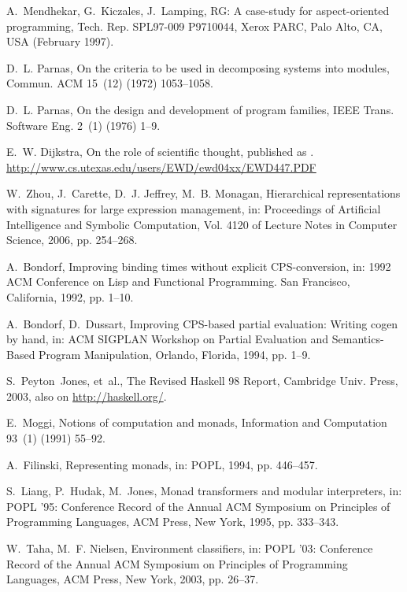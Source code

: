 \documentclass{elsart}
\begin{document}
\begin{thebibliography}{10}
A.~Mendhekar, G.~Kiczales, J.~Lamping, {RG}: {A} case-study for aspect-oriented
  programming, Tech. Rep. SPL97-009 P9710044, {X}erox {PARC}, Palo Alto, CA,
  USA (February 1997).

D.~L. Parnas, On the criteria to be used in decomposing systems into modules,
  Commun. ACM 15~(12) (1972) 1053--1058.

D.~L. Parnas, On the design and development of program families, IEEE Trans.
  Software Eng. 2~(1) (1976) 1--9.

E.~W. Dijkstra, On the role of scientific thought, published as
  \cite{EWD:EWD447pub}.
\newline\urlprefix\url{http://www.cs.utexas.edu/users/EWD/ewd04xx/EWD447.PDF}

W.~Zhou, J.~Carette, D.~J. Jeffrey, M.~B. Monagan, Hierarchical representations
  with signatures for large expression management, in: Proceedings of
  Artificial Intelligence and Symbolic Computation, Vol. 4120 of Lecture Notes
  in Computer Science, 2006, pp. 254--268.

A.~Bondorf, Improving binding times without explicit {CPS}-conversion, in: 1992
  ACM Conference on Lisp and Functional Programming. San Francisco, California,
  1992, pp. 1--10.

A.~Bondorf, D.~Dussart, Improving {CPS-}based partial evaluation: Writing cogen
  by hand, in: {ACM} {SIGPLAN} Workshop on Partial Evaluation and
  Semantics-Based Program Manipulation, Orlando, Florida, 1994, pp. 1--9.

S.~Peyton~Jones, et~al., The Revised Haskell 98 Report, Cambridge Univ.\null{}
  Press, 2003, also on \url{http://haskell.org/}.

E.~Moggi, Notions of computation and monads, Information and Computation 93~(1)
  (1991) 55--92.

A.~Filinski, Representing monads, in: POPL, 1994, pp. 446--457.

S.~Liang, P.~Hudak, M.~Jones, Monad transformers and modular interpreters, in:
  {POPL} '95: Conference Record of the Annual {ACM} Symposium on Principles of
  Programming Languages, {ACM} {P}ress, {N}ew {Y}ork, 1995, pp. 333--343.

W.~Taha, M.~F. Nielsen, Environment classifiers, in: {POPL} '03: Conference
  Record of the Annual {ACM} Symposium on Principles of Programming Languages,
  {ACM} {P}ress, {N}ew {Y}ork, 2003, pp. 26--37.


\end{thebibliography}
\end{document}

